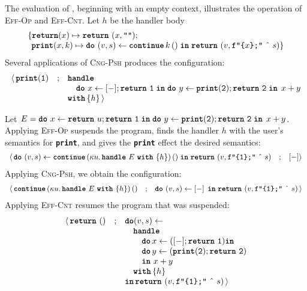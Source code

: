 The evaluation of , beginning with an empty context, illustrates the operation of  \textsc{Eff-Op} and \textsc{Eff-Cnt}. Let $h$ be the handler body 
\[\begin{array}{l}\{ \textbf{\texttt{return}}(x) \mapsto {\texttt{\textbf{return}} \,\, {(x, \texttt{""})}}; \\
\; \, \textbf{\texttt{print}}(x, k) \mapsto {\texttt{\textbf{do}} \,\, {(v, s)} \leftarrow {\textbf{\texttt{continue}} \, {k} \, {()}} \; \textbf{\texttt{in}} \; {\texttt{\textbf{return}} \,\, {(v, \texttt{f"\{$x$\};"} \text{ \^\ } s)}}}\}\end{array}\]
Several applications of \textsc{Cng-Psh} produces the configuration:
{  \arraycolsep=3pt
\small
\[\begin{array}{rcl}
  \langle \, \texttt{\textbf{print}}(\texttt{1}) &;& \textbf{\texttt{handle}}\\
                        && \quad \texttt{\textbf{do}} \,\, {x} \leftarrow {[-];\texttt{\textbf{return}} \,\, {\texttt{1}}} \; \textbf{\texttt{in}} \; {{\texttt{\textbf{do}} \,\, {y} \leftarrow {\texttt{\textbf{print}}(\texttt{2});\texttt{\textbf{return}} \,\, {\texttt{2}}} \; \textbf{\texttt{in}} \; {\, x + y}}} \\
                        && \textbf{\texttt{with}} \, \{ h \}\, \rangle
\end{array}
  \]
}

Let $E = \texttt{\textbf{do}} \,\, {x} \leftarrow {\texttt{\textbf{return}} \,\, {u};\texttt{\textbf{return}} \,\, {\texttt{1}}} \; \textbf{\texttt{in}} \; {{\texttt{\textbf{do}} \,\, {y} \leftarrow {\texttt{\textbf{print}}(\texttt{2});\texttt{\textbf{return}} \,\, {\texttt{2}}} \; \textbf{\texttt{in}} \; {\, x + y}}}$. Applying \textsc{Eff-Op} suspends the program, finds the handler $h$ with the user's semantics for \textbf{\texttt{print}}, and gives the \textbf{\texttt{print}} effect the desired semantics:
{  \arraycolsep=3pt
\small
\[\begin{array}{rcl}
  \langle \, \texttt{\textbf{do}} \,\, {(v, s)} \leftarrow {\textbf{\texttt{continue}} \, {(\kappa{} u. \, \textbf{\texttt{handle}} \,\, {E} \,\, \textbf{\texttt{with}} \,\, \{{h}\})} \, {()}} \; \textbf{\texttt{in}} \; {\texttt{\textbf{return}} \,\, {(v, \texttt{f"\{1\};"} \text{ \^\ } s)}} &;& [-] \rangle
\end{array}
  \]
}
Applying \textsc{Cng-Psh}, we obtain the configuration:
{  \arraycolsep=3pt
\small
\[\begin{array}{rcl}
  \langle \, \textbf{\texttt{continue}} \, {(\kappa{} u. \, \textbf{\texttt{handle}} \,\, {E} \,\, \textbf{\texttt{with}} \,\, \{{h}\})} \, {()} &;& \texttt{\textbf{do}} \,\, {(v, s)} \leftarrow {[-]\,} \; \textbf{\texttt{in}} \; {\texttt{\textbf{return}} \,\, {(v, \texttt{f"\{1\};"} \text{ \^\ } s)}}\, \rangle
\end{array}
  \]
}
Applying \textsc{Eff-Cnt} resumes the program that was suspended:
{  \arraycolsep=3pt
\small
\[\begin{array}{rcl}
  \langle \, \texttt{\textbf{return}} \,\, {()} &;& \textbf{\texttt{do}} {(v, s)} \leftarrow \\
  && \quad \textbf{\texttt{handle}} \\
  && \quad \quad \textbf{\texttt{do}} \, x \leftarrow ([-];\texttt{\textbf{return}} \,\, {\texttt{1}}) \textbf{\texttt{in}}\\
  && \quad \quad \textbf{\texttt{do}} \, y \leftarrow (\texttt{\textbf{print}}(\texttt{2});\texttt{\textbf{return}} \,\, {\texttt{2}})\\
  && \quad\quad \textbf{\texttt{in}} \, {\, x + y}\\
  && \quad \textbf{\texttt{with}} \, \{ h \}\\
  && \textbf{\texttt{in}} \, \texttt{\textbf{return}} \,\, {(v, \texttt{f"\{1\};"} \text{ \^\ } s)}  \, \rangle
\end{array}
  \]
}

